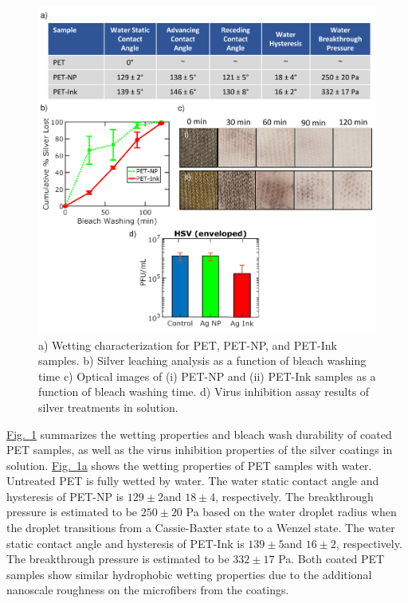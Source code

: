 \documentclass[journal=jacsat,manuscript=article]{achemso}
\newcommand{\figref}[2][]{\hyperref[#2]{Fig.~\ref{#2}#1}}
\begin{document}
\begin{figure}[H]
       \centering
    \includegraphics[width= \linewidth]{Figures/fig_wash1.pdf}
\caption[Wash Durability of silver coated fabric]{
a) Wetting characterization for PET, PET-NP, and PET-Ink samples. b) Silver leaching analysis as a function of bleach washing time c) Optical images of (i) PET-NP and (ii) PET-Ink samples as a function of bleach washing time. d) Virus inhibition assay results of silver treatments in solution.} 
\label{fig:durable}
\end{figure}

\figref{fig:durable} summarizes the wetting  properties and bleach wash durability of coated PET samples, as well as the virus inhibition properties of the silver coatings in solution.
\figref[a]{fig:durable} shows the wetting properties of PET samples with water. 
Untreated PET is fully wetted by water. The water static contact angle and hysteresis of PET-NP is $129 \pm 2$\degree and $18 \pm 4$\degree, respectively. 
The breakthrough pressure is estimated to be 
$250 \pm 20$ Pa based on the water droplet radius when the droplet transitions from a Cassie-Baxter state to a Wenzel state.  
The water static contact angle and hysteresis of PET-Ink is $139 \pm 5$\degree and $16 \pm 2$\degree, respectively. The breakthrough pressure is estimated to be $332 \pm 17$ Pa. 
Both coated PET samples show similar hydrophobic wetting properties due to the additional nanoscale roughness on the microfibers from the coatings. %
\end{document}
